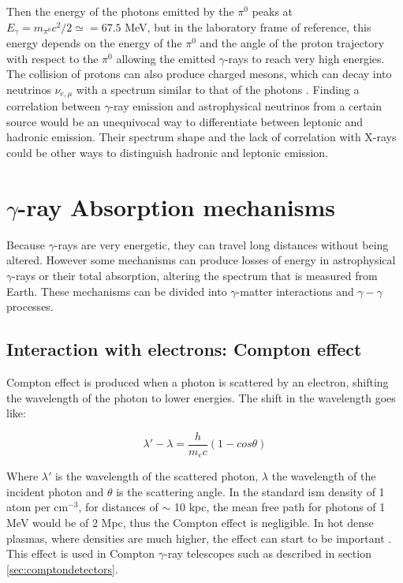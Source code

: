 \documentclass[main.tex]{subfiles}
\begin{document}
Then the energy of the photons emitted by the $\pi^{0}$ peaks at $E_{\gamma} = m_{\pi^{0}}c^{2}/2 \simeq = 67.5$ MeV, but in the laboratory frame of reference, this energy depends on the energy of the $\pi^{0}$ and the angle of the proton trajectory with respect to the $\pi^{0}$ allowing the emitted $\gamma$-rays to reach very high energies.
The collision of protons can also produce charged mesons, which can decay into neutrinos $\nu_{e,\mu}$ with a spectrum similar to that of the photons \cite{2004VHECosmicGammaRadiation}. Finding a correlation between $\gamma$-ray emission and astrophysical neutrinos from a certain source would be an unequivocal way to differentiate between leptonic and hadronic emission. Their spectrum shape and the lack of correlation with X-rays could be other ways to distinguish hadronic and leptonic emission. 

\section{$\gamma$-ray Absorption mechanisms} \label{sec:absorption}
 
Because $\gamma$-rays are very energetic, they can travel long distances without being altered. However some mechanisms can produce losses of energy in astrophysical $\gamma$-rays or their total absorption, altering the spectrum that is measured from Earth. These mechanisms can be divided into $\gamma$-matter interactions and $\gamma-\gamma$ processes.

\subsection{Interaction with electrons: Compton effect}

Compton effect is produced when a photon is scattered by an electron, shifting the wavelength of the photon to lower energies. The shift in the wavelength goes like:

\begin{equation}
    \lambda '-\lambda = \frac{h}{m_e c}(1-cos\theta)    
\end{equation}

Where $\lambda'$ is the wavelength of the scattered photon, $\lambda$ the wavelength of the incident photon and $\theta$ is the scattering angle. In the standard \gls{ism} density of 1 atom per cm$^{-3}$, for distances of $\sim$ 10 kpc, the mean free path for photons of 1 MeV would be of 2 Mpc, thus the Compton effect is negligible. In hot dense plasmas, where densities are much higher, the effect can start to be important \cite{1993MurthyGammaRay}.
This effect is used in Compton $\gamma$-ray telescopes such as described in section \ref{sec:comptondetectors}. 
\end{document}
